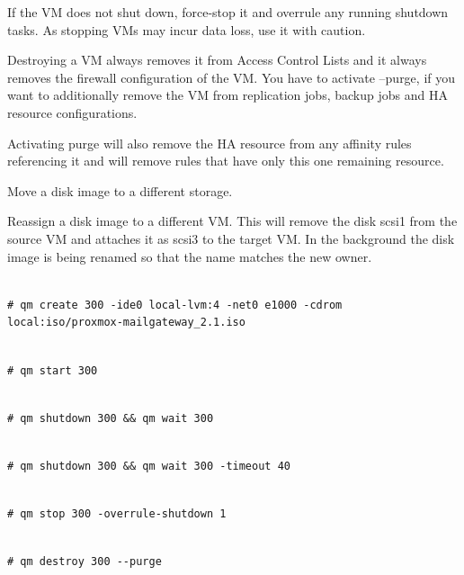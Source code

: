 If the VM does not shut down, force-stop it and overrule any running shutdown tasks. As stopping VMs may incur data loss, use it with caution.

Destroying a VM always removes it from Access Control Lists and it always removes the firewall configuration of the VM. You have to activate --purge, if you want to additionally remove the VM from replication jobs, backup jobs and HA resource configurations.

Activating purge will also remove the HA resource from any affinity rules referencing it and will remove rules that have only this one remaining resource.

Move a disk image to a different storage.

Reassign a disk image to a different VM. This will remove the disk scsi1 from the source VM and attaches it as scsi3 to the target VM. In the background the disk image is being renamed so that the name matches the new owner.

\begin{lstlisting}

# qm create 300 -ide0 local-lvm:4 -net0 e1000 -cdrom local:iso/proxmox-mailgateway_2.1.iso

\end{lstlisting}

\begin{lstlisting}

# qm start 300

\end{lstlisting}

\begin{lstlisting}

# qm shutdown 300 && qm wait 300

\end{lstlisting}

\begin{lstlisting}

# qm shutdown 300 && qm wait 300 -timeout 40

\end{lstlisting}

\begin{lstlisting}

# qm stop 300 -overrule-shutdown 1

\end{lstlisting}

\begin{lstlisting}

# qm destroy 300 --purge

\end{lstlisting}

